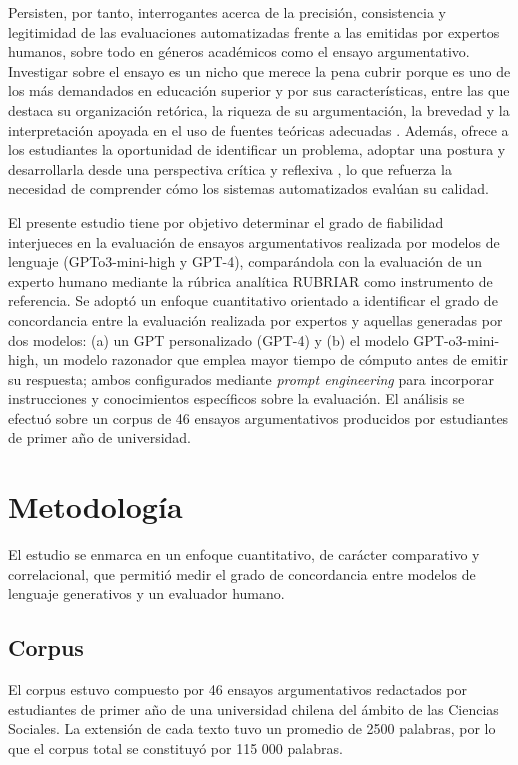 \documentclass[spanish]{textolivre}
\begin{document}
Persisten, por tanto, interrogantes acerca de la precisión, consistencia y legitimidad de las evaluaciones automatizadas frente a las emitidas por expertos humanos, sobre todo en géneros académicos como el ensayo argumentativo. Investigar sobre el ensayo es un nicho que merece la pena cubrir porque es uno de los más demandados en educación superior \cite{kloss2024} y por sus características, entre las que destaca su organización retórica, la riqueza de su argumentación, la brevedad y la interpretación apoyada en el uso de fuentes teóricas adecuadas \cite{zunino2012}. Además, ofrece a los estudiantes la oportunidad de identificar un problema, adoptar una postura y desarrollarla desde una perspectiva crítica y reflexiva \cite{kloss-burdiles2025}, lo que refuerza la necesidad de comprender cómo los sistemas automatizados evalúan su calidad.

El presente estudio tiene por objetivo determinar el grado de fiabilidad interjueces en la evaluación de ensayos argumentativos realizada por modelos de lenguaje (GPTo3-mini-high y GPT-4), comparándola con la evaluación de un experto humano mediante la rúbrica analítica RUBRIAR \cite{kloss2024} como instrumento de referencia. Se adoptó un enfoque cuantitativo orientado a identificar el grado de concordancia entre la evaluación realizada por expertos y aquellas generadas por dos modelos: (a) un GPT personalizado (GPT-4) y (b) el modelo GPT-o3-mini-high, un modelo razonador que emplea mayor tiempo de cómputo antes de emitir su respuesta; ambos configurados mediante \textit{prompt engineering} para incorporar instrucciones y conocimientos específicos sobre la evaluación. El análisis se efectuó sobre un corpus de 46 ensayos argumentativos producidos por estudiantes de primer año de universidad.


\section{Metodología}
El estudio se enmarca en un enfoque cuantitativo, de carácter comparativo y correlacional, que permitió medir el grado de concordancia entre modelos de lenguaje generativos y un evaluador humano. 

\subsection{Corpus}
El corpus estuvo compuesto por 46 ensayos argumentativos redactados por estudiantes de primer año de una universidad chilena del ámbito de las Ciencias Sociales. La extensión de cada texto tuvo un promedio de 2500 palabras, por lo que el corpus total se constituyó por 115 000 palabras.
\end{document}
